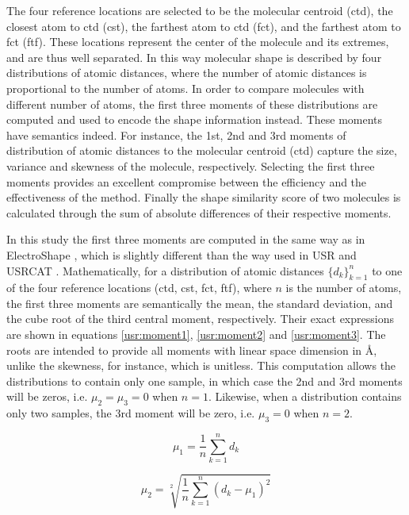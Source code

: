 The four reference locations are selected to be the molecular centroid (ctd), the closest atom to ctd (cst), the farthest atom to ctd (fct), and the farthest atom to fct (ftf). These locations represent the center of the molecule and its extremes, and are thus well separated. In this way molecular shape is described by four distributions of atomic distances, where the number of atomic distances is proportional to the number of atoms. In order to compare molecules with different number of atoms, the first three moments of these distributions are computed and used to encode the shape information instead. These moments have semantics indeed. For instance, the 1st, 2nd and 3rd moments of distribution of atomic distances to the molecular centroid (ctd) capture the size, variance and skewness of the molecule, respectively. Selecting the first three moments provides an excellent compromise between the efficiency and the effectiveness of the method. Finally the shape similarity score of two molecules is calculated through the sum of absolute differences of their respective moments.

In this study the first three moments are computed in the same way as in ElectroShape \citep{1337}, which is slightly different than the way used in USR \citep{1379,1332,1380} and USRCAT \citep{1331}. Mathematically, for a distribution of atomic distances $\{d_k\}_{k=1}^n$ to one of the four reference locations (ctd, cst, fct, ftf), where $n$ is the number of atoms, the first three moments are semantically the mean, the standard deviation, and the cube root of the third central moment, respectively. Their exact expressions are shown in equations \eqref{usr:moment1}, \eqref{usr:moment2} and \eqref{usr:moment3}. The roots are intended to provide all moments with linear space dimension in \AA, unlike the skewness, for instance, which is unitless. This computation allows the distributions to contain only one sample, in which case the 2nd and 3rd moments will be zeros, i.e. $\mu_2=\mu_3=0$ when $n=1$. Likewise, when a distribution contains only two samples, the 3rd moment will be zero, i.e. $\mu_3=0$ when $n=2$.

\begin{equation}
\mu_1=\frac{1}{n}\sum_{k=1}^{n}{d_k}
\label{usr:moment1}
\end{equation}

\begin{equation}
\mu_2=\sqrt[2]{\frac{1}{n}\sum_{k=1}^{n}{(d_k-\mu_1)^2}}
\label{usr:moment2}
\end{equation}

